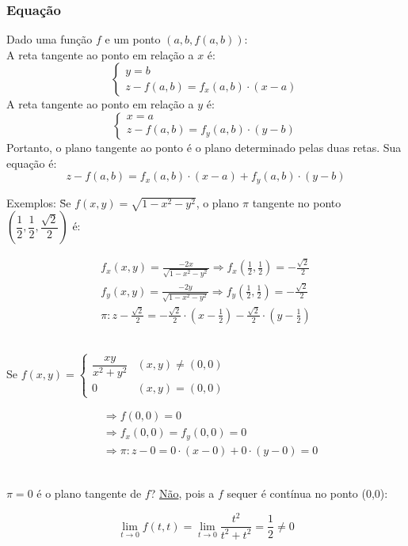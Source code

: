 \documentclass{article}
\begin{document}
\subsubsection{Equação}
Dado uma função $f$ e um ponto $(a, b, f(a,b))$:\\[5pt]
\indent A reta tangente ao ponto em relação a $x$ é:
\[ \begin{cases}
  y = b\\
  z - f(a,b) = f_x(a, b) \cdot (x - a)
\end{cases} \]
\indent A reta tangente ao ponto em relação a $y$ é:
\[ \begin{cases}
  x = a\\
  z - f(a,b) = f_y(a, b) \cdot (y - b)
\end{cases} \]
\indent Portanto, o plano tangente ao ponto é o plano determinado pelas duas retas. Sua equação é:
\[ z - f(a,b) = f_x(a, b) \cdot(x - a) + f_y(a, b) \cdot(y - b) \]
\vspace{-5pt}
\begin{tabbing}
  Exemplos: \=Se $f(x, y) = \sqrt{1 - x^2 - y^2}$, o plano $\pi$ tangente no ponto $\left(\dfrac{1}{2}, \dfrac{1}{2}, \dfrac{\sqrt{2}}{2}\right)$ é: \\
  \>\begin{minipage}{300pt}
    \begin{gather*}
      f_x(x, y) = \frac{-2x}{\sqrt{1 - x^2 - y^2}} \Rightarrow f_x\left( \frac{1}{2}, \frac{1}{2} \right) = - \frac{\sqrt{2}}{2} \\
      f_y(x, y) = \frac{-2y}{\sqrt{1 - x^2 - y^2}} \Rightarrow f_y\left( \frac{1}{2}, \frac{1}{2} \right) = - \frac{\sqrt{2}}{2} \\[10pt]
      \pi : z - \frac{\sqrt{2}}{2} = - \frac{\sqrt{2}}{2} \cdot \left( x - \frac{1}{2} \right) - \frac{\sqrt{2}}{2} \cdot \left( y - \frac{1}{2} \right)
    \end{gather*}
  \end{minipage}\\[20pt]
  \>Se $ f(x,y) = \begin{cases}
                    \dfrac{xy}{x^2 + y^2} & (x,y) \neq (0,0) \\[5pt]
                    0 & (x,y) = (0,0)
                  \end{cases} $ \\
  \>\begin{minipage}{270pt}
      \begin{align*}
        &\Rightarrow f(0,0) = 0 \\[5pt]
        &\Rightarrow f_x(0,0) = f_y(0,0) = 0 \\[5pt]
        &\Rightarrow \pi : z - 0 = 0 \cdot (x - 0) + 0 \cdot (y - 0) = 0
      \end{align*}
    \end{minipage} \\[5pt]
  \>\quad $\pi = 0$ é o plano tangente de $f$? \uline{Não}, pois a $f$ sequer é contínua no ponto (0,0):\\[5pt]
  \>\begin{minipage}{235pt}
    \[ \lim_{t \to 0} f(t, t) = \lim_{t \to 0} \frac{t^2}{t^2 + t^2} = \frac{1}{2} \neq 0 \]
  \end{minipage}
\end{tabbing}
\end{document}
